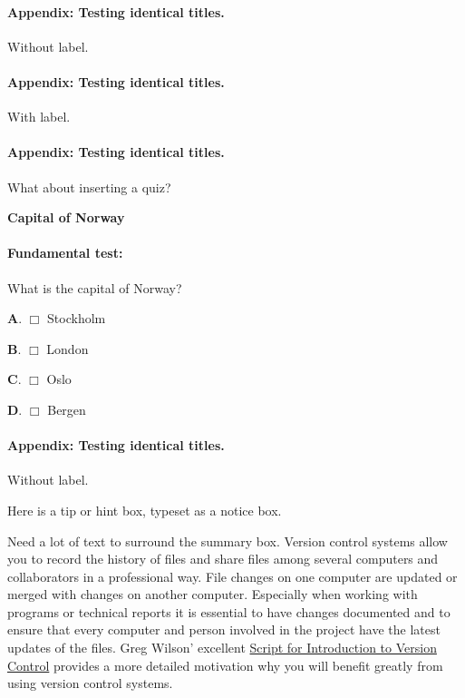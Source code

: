 \documentclass[%
oneside,                 %
final,                   %
10pt]{article}
\newenvironment{doconcequiz}{}{}
\newcounter{doconcequizcounter}
\newenvironment{notice_mdfboxadmon}[1][]{
\begin{notice_mdfboxmdframed}[frametitle=#1]
}
{
\end{notice_mdfboxmdframed}
}
\theoremstyle{definition}
\begin{document}
\begin{enumerate}
\paragraph{Appendix: Testing identical titles.}
Without label.
\paragraph{Appendix: Testing identical titles.}
\label{test:title:id1}
With label.
\paragraph{Appendix: Testing identical titles.}
\label{test:title:id2}
What about inserting a quiz?

\begin{doconcequiz}
\label{quiz:2}


\noindent\textbf{\large Capital of Norway}
\paragraph{Fundamental test:}
What is the capital of Norway?

\vspace{2mm}

\textbf{A}. $\Box$ 
Stockholm

\textbf{B}. $\Box$ 
London

\textbf{C}. $\Box$ 
Oslo

\textbf{D}. $\Box$ 
Bergen



\vspace{3mm}

\end{doconcequiz}


\paragraph{Appendix: Testing identical titles.}
Without label.

\begin{notice_mdfboxadmon}[Tip.]
Here is a tip or hint box, typeset as a notice box.
\end{notice_mdfboxadmon} %


\clearpage
Need a lot of text to surround the summary box.
Version control systems allow you to record the history of files
and share files among several computers and collaborators in a
professional way. File changes on one computer are updated or
merged with changes on another computer. Especially when working
with programs or technical reports it is essential
to have changes documented and to
ensure that every computer and person involved in the project
have the latest updates of the files.
Greg Wilson' excellent \href{{https://software-carpentry.org/2010/07/script-for-introduction-to-version-control/}}{Script for Introduction to Version Control} provides a more detailed motivation why you will benefit greatly
from using version control systems.


\end{enumerate}
\end{document}
